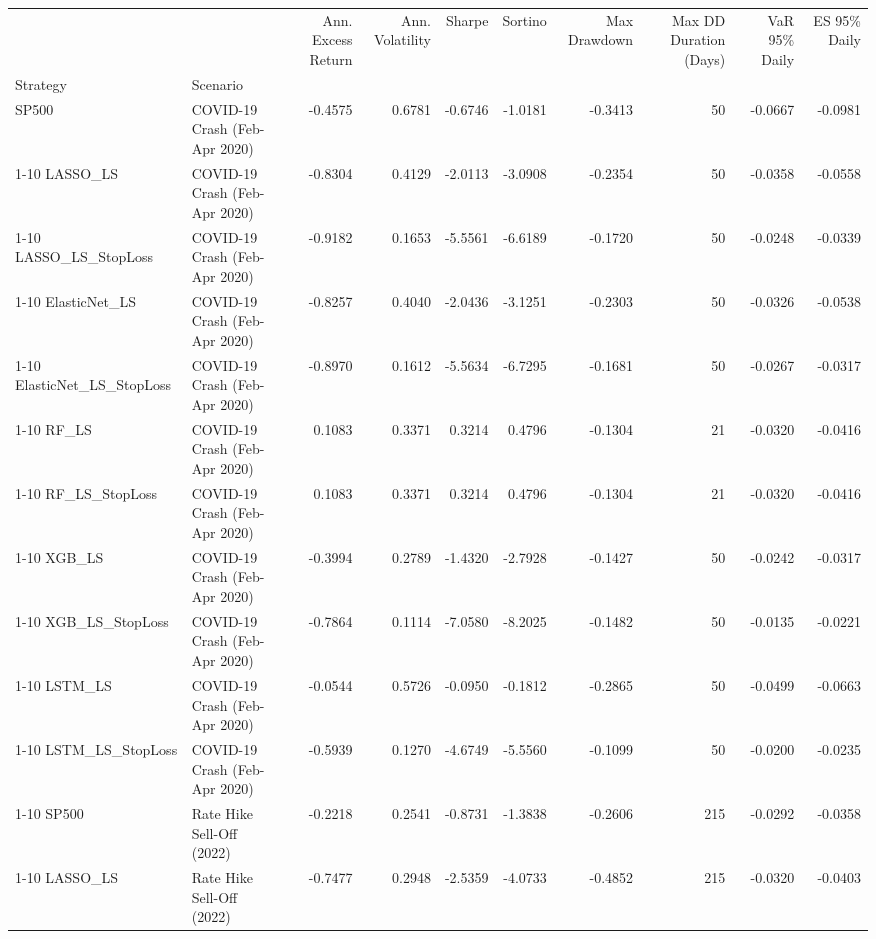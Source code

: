 \begin{tabular}{llrrrrrrrr}
\toprule
 &  & Ann. Excess Return & Ann. Volatility & Sharpe & Sortino & Max Drawdown & Max DD Duration (Days) & VaR 95\% Daily & ES 95\% Daily \\
Strategy & Scenario &  &  &  &  &  &  &  &  \\
\midrule
SP500 & COVID-19 Crash (Feb-Apr 2020) & -0.4575 & 0.6781 & -0.6746 & -1.0181 & -0.3413 & 50 & -0.0667 & -0.0981 \\
\cline{1-10}
LASSO\_LS & COVID-19 Crash (Feb-Apr 2020) & -0.8304 & 0.4129 & -2.0113 & -3.0908 & -0.2354 & 50 & -0.0358 & -0.0558 \\
\cline{1-10}
LASSO\_LS\_StopLoss & COVID-19 Crash (Feb-Apr 2020) & -0.9182 & 0.1653 & -5.5561 & -6.6189 & -0.1720 & 50 & -0.0248 & -0.0339 \\
\cline{1-10}
ElasticNet\_LS & COVID-19 Crash (Feb-Apr 2020) & -0.8257 & 0.4040 & -2.0436 & -3.1251 & -0.2303 & 50 & -0.0326 & -0.0538 \\
\cline{1-10}
ElasticNet\_LS\_StopLoss & COVID-19 Crash (Feb-Apr 2020) & -0.8970 & 0.1612 & -5.5634 & -6.7295 & -0.1681 & 50 & -0.0267 & -0.0317 \\
\cline{1-10}
RF\_LS & COVID-19 Crash (Feb-Apr 2020) & 0.1083 & 0.3371 & 0.3214 & 0.4796 & -0.1304 & 21 & -0.0320 & -0.0416 \\
\cline{1-10}
RF\_LS\_StopLoss & COVID-19 Crash (Feb-Apr 2020) & 0.1083 & 0.3371 & 0.3214 & 0.4796 & -0.1304 & 21 & -0.0320 & -0.0416 \\
\cline{1-10}
XGB\_LS & COVID-19 Crash (Feb-Apr 2020) & -0.3994 & 0.2789 & -1.4320 & -2.7928 & -0.1427 & 50 & -0.0242 & -0.0317 \\
\cline{1-10}
XGB\_LS\_StopLoss & COVID-19 Crash (Feb-Apr 2020) & -0.7864 & 0.1114 & -7.0580 & -8.2025 & -0.1482 & 50 & -0.0135 & -0.0221 \\
\cline{1-10}
LSTM\_LS & COVID-19 Crash (Feb-Apr 2020) & -0.0544 & 0.5726 & -0.0950 & -0.1812 & -0.2865 & 50 & -0.0499 & -0.0663 \\
\cline{1-10}
LSTM\_LS\_StopLoss & COVID-19 Crash (Feb-Apr 2020) & -0.5939 & 0.1270 & -4.6749 & -5.5560 & -0.1099 & 50 & -0.0200 & -0.0235 \\
\cline{1-10}
SP500 & Rate Hike Sell-Off (2022) & -0.2218 & 0.2541 & -0.8731 & -1.3838 & -0.2606 & 215 & -0.0292 & -0.0358 \\
\cline{1-10}
LASSO\_LS & Rate Hike Sell-Off (2022) & -0.7477 & 0.2948 & -2.5359 & -4.0733 & -0.4852 & 215 & -0.0320 & -0.0403 \\

\end{tabular}
